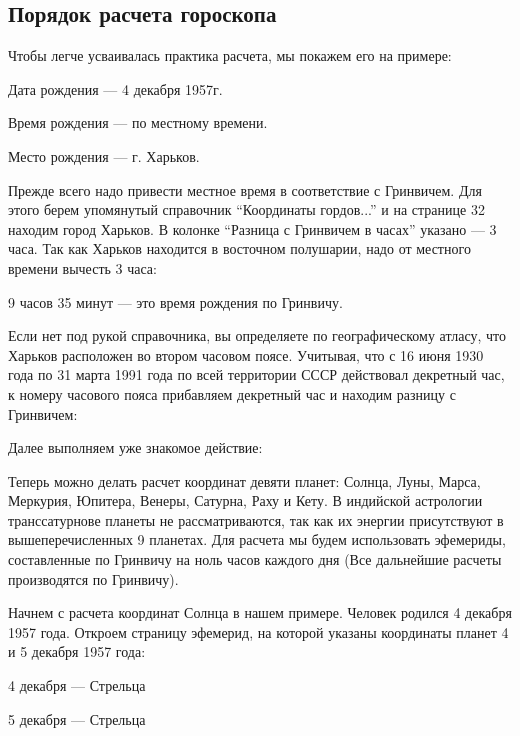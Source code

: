 \subsection{Порядок расчета гороскопа}

Чтобы легче усваивалась практика расчета, мы покажем его на примере:
\begin{mylist}
	\item Дата рождения --- 4 декабря 1957г.
	\item Время рождения ---  по местному времени.
	\item Место рождения --- г. Харьков.
\end{mylist}

Прежде всего надо привести местное время в соответствие с Гринвичем. Для этого берем упомянутый справочник ``Координаты гордов...'' и на странице 32 находим город Харьков. В колонке ``Разница с Гринвичем в часах'' указано --- 3 часа. Так как Харьков находится в восточном полушарии, надо от местного времени вычесть 3 часа:

9 часов 35 минут --- это время рождения по Гринвичу.

Если нет под рукой справочника, вы определяете по географическому атласу, что Харьков расположен во втором часовом поясе. Учитывая, что с 16 июня 1930 года по 31 марта 1991 года по всей территории СССР действовал декретный час, к номеру часового пояса прибавляем декретный час и находим разницу с Гринвичем:

Далее выполняем уже знакомое действие:

Теперь можно делать расчет координат девяти планет: Солнца, Луны, Марса, Меркурия, Юпитера, Венеры, Сатурна, Раху и Кету. В индийской астрологии транссатурнове планеты не рассматриваются, так как их энергии присутствуют в вышеперечисленных 9 планетах. Для расчета мы будем использовать эфемериды, составленные по Гринвичу на ноль часов каждого дня (Все дальнейшие расчеты производятся по Гринвичу).

Начнем с расчета координат Солнца в нашем примере. Человек родился 4 декабря 1957 года. Откроем страницу эфемерид, на которой указаны координаты планет 4 и 5 декабря 1957 года:
\begin{mylist}
	\item 4 декабря ---  Стрельца
	\item 5 декабря ---  Стрельца
\end{mylist}

